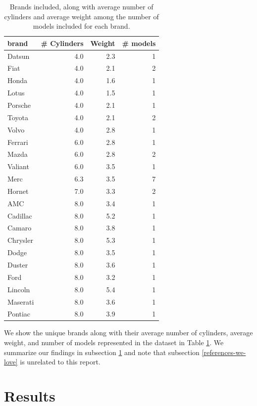 \documentclass[
  english,
  man,floatsintext]{apa6}
\begin{document}
\begin{table}

\caption{\label{tab:summary-tbl}Brands included, along with average number of cylinders and average weight among the number of models included for each brand.}
\centering
\begin{tabular}[t]{l|r|r|r}
\hline
brand & \# Cylinders & Weight & \# models\\
\hline
Datsun & 4.0 & 2.3 & 1\\
\hline
Fiat & 4.0 & 2.1 & 2\\
\hline
Honda & 4.0 & 1.6 & 1\\
\hline
Lotus & 4.0 & 1.5 & 1\\
\hline
Porsche & 4.0 & 2.1 & 1\\
\hline
Toyota & 4.0 & 2.1 & 2\\
\hline
Volvo & 4.0 & 2.8 & 1\\
\hline
Ferrari & 6.0 & 2.8 & 1\\
\hline
Mazda & 6.0 & 2.8 & 2\\
\hline
Valiant & 6.0 & 3.5 & 1\\
\hline
Merc & 6.3 & 3.5 & 7\\
\hline
Hornet & 7.0 & 3.3 & 2\\
\hline
AMC & 8.0 & 3.4 & 1\\
\hline
Cadillac & 8.0 & 5.2 & 1\\
\hline
Camaro & 8.0 & 3.8 & 1\\
\hline
Chrysler & 8.0 & 5.3 & 1\\
\hline
Dodge & 8.0 & 3.5 & 1\\
\hline
Duster & 8.0 & 3.6 & 1\\
\hline
Ford & 8.0 & 3.2 & 1\\
\hline
Lincoln & 8.0 & 5.4 & 1\\
\hline
Maserati & 8.0 & 3.6 & 1\\
\hline
Pontiac & 8.0 & 3.9 & 1\\
\hline
\end{tabular}
\end{table}

We show the unique brands along with their average number of cylinders, average weight, and number of models represented in the dataset in Table \ref{tab:summary-tbl}. We summarize our findings in subsection \ref{results} and note that subsection \ref{references-we-love} is unrelated to this report.

\hypertarget{results}{%
\section{Results}\label{results}}
\end{document}
